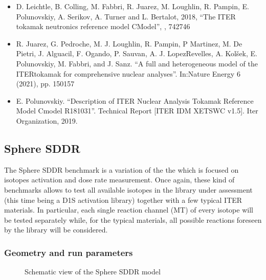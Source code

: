 \documentclass[letterpaper,10pt,english]{sphinxmanual}
\let\sphinxpxdimen\pdfpxdimen\else\newdimen\sphinxpxdimen
\begin{document}
\sphinxAtStartPar
{}
\begin{itemize}
\item {} 
\sphinxAtStartPar
D. Leichtle, B. Colling, M. Fabbri, R. Juarez, M. Loughlin,
R. Pampin, E. Polunovskiy, A. Serikov, A. Turner and L. Bertalot, 2018,
“The ITER tokamak neutronics reference model C\sphinxhyphen{}Model”,
,  742\sphinxhyphen{}746

\item {} 
\sphinxAtStartPar
R. Juarez, G. Pedroche, M. J. Loughlin, R. Pampin, P Martinez, M. De Pietri,
J. Alguacil, F. Ogando, P. Sauvan, A. J. Lopez\sphinxhyphen{}Revelles, A. Kolšek,
E. Pol\sphinxhyphen{}unovskiy, M. Fabbri, and J. Sanz. “A full and heterogeneous model of
the ITERtokamak for comprehensive nuclear analyses”.
In:Nature Energy 6 (2021), pp. 150\textendash{}157

\item {} 
\sphinxAtStartPar
E. Polunovskiy. “Description of ITER Nuclear Analysis Tokamak Reference Model
C\sphinxhyphen{}model R181031”. Technical Report {[}ITER IDM XETSWC v1.5{]}. Iter Organization, 2019.

\end{itemize}




\subsection{Sphere SDDR}
\label{\detokenize{usage/benchmarks:sphere-sddr}}
\sphinxAtStartPar
The Sphere SDDR benchmark is a variation of the the {\hyperref[\detokenize{usage/benchmarks:spheredesc}]{}}
which is focused on isotopes activation and dose rate measurement.
Once again, these kind of benchmarks allows to test all available
isotopes in the library under assessment (this time being a D1S activation
library) together with a few typical ITER materials. In particular, each
single reaction channel (MT) of every isotope will be tested separately while,
for the typical materials, all possible reactions foreseen by the library will
be considered.


\subsubsection{Geometry and run parameters}
\label{\detokenize{usage/benchmarks:id7}}
\begin{figure}[htbp]
\centering
\capstart

\noindent\sphinxincludegraphics[width=600\sphinxpxdimen]{{sphereSDDRgeom}.png}
\caption{Schematic view of the Sphere SDDR model}\label{\detokenize{usage/benchmarks:id26}}\end{figure}
\end{document}
